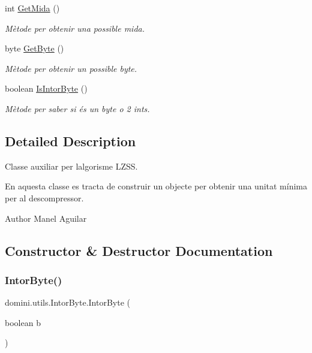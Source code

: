 \begin{DoxyCompactItemize}
int \hyperlink{classdomini_1_1utils_1_1IntorByte_abccf2f9cda2f62acdf0c1342f9acdead}{Get\+Mida} ()
\begin{DoxyCompactList}\small\item\em Mètode per obtenir una possible mida. \end{DoxyCompactList}\item 
byte \hyperlink{classdomini_1_1utils_1_1IntorByte_afd907b7001011bbca374605fb11491f4}{Get\+Byte} ()
\begin{DoxyCompactList}\small\item\em Mètode per obtenir un possible byte. \end{DoxyCompactList}\item 
boolean \hyperlink{classdomini_1_1utils_1_1IntorByte_a4fcfaf967d0c82b8147d632da4e238d0}{Is\+Intor\+Byte} ()
\begin{DoxyCompactList}\small\item\em Mètode per saber si és un byte o 2 int\textquotesingle{}s. \end{DoxyCompactList}\end{DoxyCompactItemize}


\subsection{Detailed Description}
Classe auxiliar per l\textquotesingle{}algorisme L\+Z\+SS. 

En aquesta classe es tracta de construir un objecte per obtenir una unitat mínima per al descompressor.

\begin{DoxyAuthor}{Author}
Manel Aguilar 
\end{DoxyAuthor}


\subsection{Constructor \& Destructor Documentation}
\mbox{\label{classdomini_1_1utils_1_1IntorByte_ac2bae675cf6c4d8880acedeefaf24060}} 
\subsubsection{\texorpdfstring{Intor\+Byte()}{IntorByte()}}
{\footnotesize\ttfamily domini.\+utils.\+Intor\+Byte.\+Intor\+Byte (\begin{DoxyParamCaption}\item[{boolean}]{b }\end{DoxyParamCaption})\hspace{0.3cm}{\ttfamily [inline]}}



